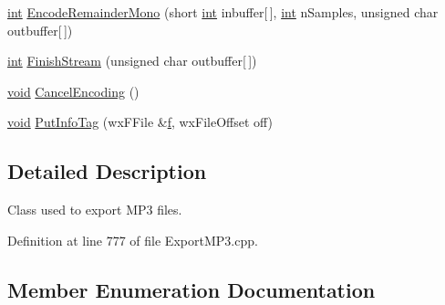 \begin{DoxyCompactItemize}
\item 
\hyperlink{xmltok_8h_a5a0d4a5641ce434f1d23533f2b2e6653}{int} \hyperlink{class_m_p3_exporter_a623ad64a67ec4435e970aa0ee2c34f8f}{Encode\+Remainder\+Mono} (short \hyperlink{xmltok_8h_a5a0d4a5641ce434f1d23533f2b2e6653}{int} inbuffer\mbox{[}$\,$\mbox{]}, \hyperlink{xmltok_8h_a5a0d4a5641ce434f1d23533f2b2e6653}{int} n\+Samples, unsigned char outbuffer\mbox{[}$\,$\mbox{]})
\item 
\hyperlink{xmltok_8h_a5a0d4a5641ce434f1d23533f2b2e6653}{int} \hyperlink{class_m_p3_exporter_aad74be0cd4310e06db9e1442e4794044}{Finish\+Stream} (unsigned char outbuffer\mbox{[}$\,$\mbox{]})
\item 
\hyperlink{sound_8c_ae35f5844602719cf66324f4de2a658b3}{void} \hyperlink{class_m_p3_exporter_a91d7807c1d73931f79662993f5bfc50f}{Cancel\+Encoding} ()
\item 
\hyperlink{sound_8c_ae35f5844602719cf66324f4de2a658b3}{void} \hyperlink{class_m_p3_exporter_a08782cafd5a97ef8b40c06e2dc40bdf4}{Put\+Info\+Tag} (wx\+F\+File \&\hyperlink{checksum_8c_ae747d72a1a803f5ff4a4b2602857d93b}{f}, wx\+File\+Offset off)
\end{DoxyCompactItemize}


\subsection{Detailed Description}
Class used to export M\+P3 files. 

Definition at line 777 of file Export\+M\+P3.\+cpp.



\subsection{Member Enumeration Documentation}
